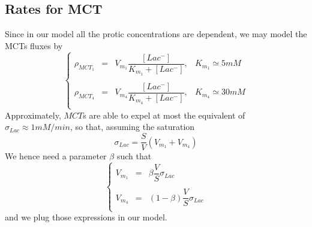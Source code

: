 \documentclass{revtex4}
\begin{document}
\subsection{Rates for MCT}
Since in our model all the protic concentrations are dependent, we may model the MCTs fluxes by
\begin{equation}
	\left\lbrace
	\begin{array}{rcll}
	\rho_{MCT_1} & = & V_{m_1} \dfrac{\left[Lac^-\right]}{K_{m_1}+\left[Lac^-\right]}, & K_{m_1}\simeq 5mM\\
	\\
	\rho_{MCT_4} & = & V_{m_4} \dfrac{\left[Lac^-\right]}{K_{m_4}+\left[Lac^-\right]}, & K_{m_4}\simeq 30mM\\
	\end{array}
	\right.
\end{equation}
Approximately, $MCT$s are able to expel at most the equivalent of $\sigma_{Lac}\approx 1mM/min$, so that, assuming the saturation
\begin{equation}
\sigma_{Lac} = \dfrac{S}{V}\left( V_{m_1} + V_{m_4} \right)
\end{equation}
We hence need a parameter $\beta$ such that
\begin{equation}
	\left\lbrace
	\begin{array}{rcr}
	V_{m_1} & = & \beta \dfrac{V}{S} \sigma_{Lac} \\
	\\
	V_{m_4} & = & (1-\beta) \dfrac{V}{S} \sigma_{Lac} \\
	\end{array}
	\right.
\end{equation}
and we plug those expressions in our model.
\end{document}
